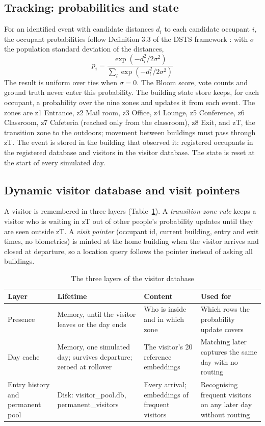 \documentclass[12pt,a4paper,oneside]{report}
\begin{document}
\subsection{Tracking: probabilities and state}
For an identified event with candidate distances $d_i$ to each candidate occupant $i$, the occupant probabilities follow Definition 3.3 of the DSTS framework \cite{ref6}: with $\sigma$ the population standard deviation of the distances,
\begin{equation}\label{eq:prob}
p_i=\frac{\exp\!\left(-d_i^{2}/2\sigma^{2}\right)}{\sum_{l}\exp\!\left(-d_l^{2}/2\sigma^{2}\right)}
\end{equation}
The result is uniform over ties when $\sigma=0$. The Bloom score, vote counts and ground truth never enter this probability. The building state store keeps, for each occupant, a probability over the nine zones and updates it from each event. The zones are z1 Entrance, z2 Mail room, z3 Office, z4 Lounge, z5 Conference, z6 Classroom, z7 Cafeteria (reached only from the classroom), z8 Exit, and zT, the transition zone to the outdoors; movement between buildings must pass through zT. The event is stored in the building that observed it: registered occupants in the registered database and visitors in the visitor database. The state is reset at the start of every simulated day.

\subsection{Dynamic visitor database and visit pointers}
A visitor is remembered in three layers (Table~\ref{tab:visitor}). A \emph{transition-zone rule} keeps a visitor who is waiting in zT out of other people's probability updates until they are seen outside zT. A \emph{visit pointer} (occupant id, current building, entry and exit times, no biometrics) is minted at the home building when the visitor arrives and closed at departure, so a location query follows the pointer instead of asking all buildings.

\begin{table}[htbp]
\centering
\caption{The three layers of the visitor database}\label{tab:visitor}
{\small\setlength{\tabcolsep}{4pt}\renewcommand{\arraystretch}{1.2}
\begin{tabular}{|p{2.68cm}|p{3.83cm}|p{3.64cm}|p{3.83cm}|}\hline
\textbf{Layer} & \textbf{Lifetime} & \textbf{Content} & \textbf{Used for}\\\hline
Presence & Memory, until the visitor leaves or the day ends & Who is inside and in which zone & Which rows the probability update covers\\\hline
Day cache & Memory, one simulated day; survives departure; zeroed at rollover & The visitor's 20 reference embeddings & Matching later captures the same day with no routing\\\hline
Entry history and permanent pool & Disk: visitor\_\allowbreak pool.db, permanent\_\allowbreak visitors & Every arrival; embeddings of frequent visitors & Recognising frequent visitors on any later day without routing\\\hline
\end{tabular}}
\end{table}
\end{document}
